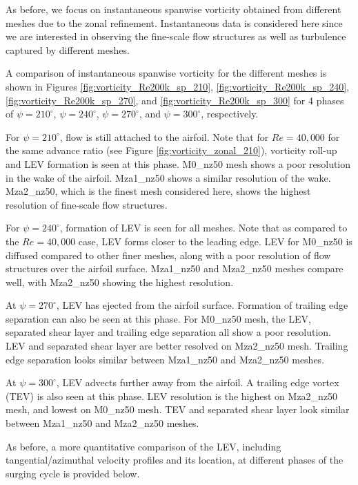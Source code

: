 As before, we focus on instantaneous spanwise vorticity obtained from different meshes due to the zonal refinement.
Instantaneous data is considered here since we are interested in observing the fine-scale flow structures as well as turbulence captured by different meshes.

A comparison of instantaneous spanwise vorticity for the different meshes is shown in Figures \ref{fig:vorticity_Re200k_sp_210}, \ref{fig:vorticity_Re200k_sp_240},  \ref{fig:vorticity_Re200k_sp_270}, and \ref{fig:vorticity_Re200k_sp_300} for 4 phases of $\psi=210^\circ$, $\psi=240^\circ$, $\psi=270^\circ$, and $\psi=300^\circ$, respectively. 

For $\psi=210^\circ$, flow is still attached to the airfoil. 
Note that for $Re=40,000$ for the same advance ratio (see Figure \ref{fig:vorticity_zonal_210}), vorticity roll-up and LEV formation is seen at this phase.
M0\_nz50 mesh shows a poor resolution in the wake of the airfoil.
Mza1\_nz50 shows a similar resolution of the wake.
Mza2\_nz50, which is the finest mesh considered here, shows the highest resolution of fine-scale flow structures. 

For $\psi=240^\circ$, formation of LEV is seen for all meshes.
Note that as compared to the $Re=40,000$ case, LEV forms closer to the leading edge.
LEV for M0\_nz50 is diffused compared to other finer meshes, along with a poor resolution of flow structures over the airfoil surface.
Mza1\_nz50 and Mza2\_nz50 meshes compare well, with Mza2\_nz50 showing the highest resolution.


At $\psi=270^\circ$, LEV has ejected from the airfoil surface. 
Formation of trailing edge separation can also be seen at this phase.
For M0\_nz50 mesh, the LEV, separated shear layer and trailing edge separation all show a poor resolution.
LEV and separated shear layer are better resolved on Mza2\_nz50 mesh.
Trailing edge separation looks similar between Mza1\_nz50 and Mza2\_nz50 meshes.


At $\psi=300^\circ$, LEV advects further away from the airfoil. A trailing edge vortex (TEV) is also seen at this phase.
LEV resolution is the highest on Mza2\_nz50 mesh, and lowest on M0\_nz50 mesh. 
TEV and separated shear layer look similar between Mza1\_nz50 and Mza2\_nz50 meshes.

As before, a more quantitative comparison of the LEV, including tangential/azimuthal velocity profiles and its location, at different phases of the surging cycle is provided below.


